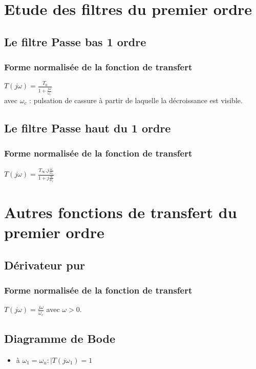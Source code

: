 \documentclass{article}
\begin{document}
\section{Etude des filtres du premier ordre}
	\subsection{Le filtre Passe bas 1 ordre}
		\subsubsection{Forme normalisée de la fonction de transfert}
		$T(j\omega)=\frac{T_0}{1+\frac{j\omega}{\omega_c}}$  \\
		[0.5cm]avec $\omega_c$ : pulsation de cassure à partir de laquelle la décroissance est visible.




	\subsection{Le filtre Passe haut du 1 ordre}
		\subsubsection{Forme normalisée de la fonction de transfert}
		$T(j\omega)=\frac{T_\infty.j\frac{\omega}{\omega_c}}{1+j\frac{w}{w_c}}$

\section{Autres fonctions de transfert du premier ordre}
	\subsection{Dérivateur pur}
		\subsubsection{Forme normalisée de la fonction de transfert}
		$T(j\omega)=\frac{j\omega}{\omega_c}$ avec $\omega>0.$
	\subsection*{Diagramme de Bode}
	\begin{itemize}
		\item à $\omega_1=\omega_u : |T(j\omega_1)=1$
	\end{itemize}
\end{document}
